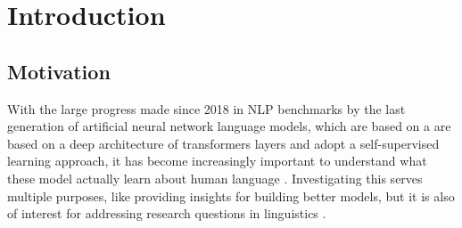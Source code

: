 
\chapter{Introduction}


\section{Motivation}

With the large progress made since 2018 in NLP benchmarks by the last generation of artificial neural network language models, which are based on a  are based on a deep architecture of transformers layers and adopt a self-supervised learning approach, it has become increasingly important to understand what these model actually learn about human language \citep{hewitt2019structural, manning2020emergent, trotta2021monolingual}. Investigating this serves multiple purposes, like providing insights for building better models, but it is also of interest for addressing research questions in linguistics \citep{hewitt2019structural}. 







